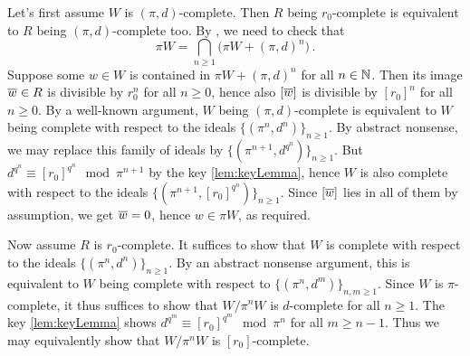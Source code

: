 \begin{proof*}
	Let's first assume $W$ is $(\pi,d)$-complete. Then $R$ being $r_0$-complete is equivalent to $R$ being $(\pi,d)$-complete too. By \cite[]{stacks-project}, we need to check that
	\begin{equation*}
		\pi W=\bigcap_{n\geq 1}\big(\pi W+(\pi,d)^n\big)\,.
	\end{equation*}
	Suppose some $w\in W$ is contained in $\pi W+(\pi,d)^n$ for all $n\in \mathbb{N}$. Then its image $\ov{w}\in R$ is divisible by $r_0^n$ for all $n\geq 0$, hence also $[\ov{w}]$ is divisible by $[r_0]^n$ for all $n\geq 0$. By a well-known argument, $W$ being $(\pi,d)$-complete is equivalent to $W$ being complete with respect to the ideals $\{(\pi^n,d^n)\}_{n\geq 1}$. By abstract nonsense, we may replace this family of ideals by $\{(\pi^{n+1},d^{q^n})\}_{n\geq 1}$. But $d^{q^n}\equiv [r_0]^{q^n}\mod \pi^{n+1}$ by the key \cref{lem:keyLemma}, hence $W$ is also complete with respect to the ideals $\{(\pi^{n+1},[r_0]^{q^n})\}_{n\geq 1}$. Since $[\ov{w}]$ lies in all of them by assumption, we get $\ov{w}=0$, hence $w\in\pi W$, as required.
	
	Now assume $R$ is $r_0$-complete. It suffices to show that $W$ is complete with respect to the ideals $\{(\pi^n,d^n)\}_{n\geq 1}$. By an abstract nonsense argument, this is equivalent to $W$ being complete with respect to $\{(\pi^n,d^m)\}_{n,m\geq 1}$. Since $W$ is $\pi$-complete, it thus suffices to show that $W/\pi^nW$ is $d$-complete for all $n\geq 1$. The key \cref{lem:keyLemma} shows $d^{q^m}\equiv [r_0]^{q^m}\mod \pi^n$ for all $m\geq n-1$. Thus we may equivalently show that $W/\pi^nW$ is $[r_0]$-complete.
	

\end{proof*}
